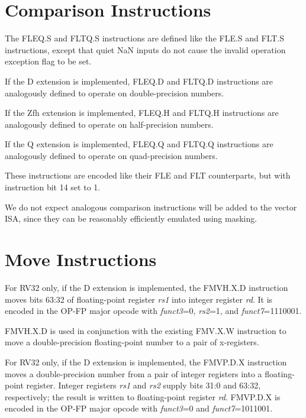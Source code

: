 \section{Comparison Instructions}

The FLEQ.S and FLTQ.S instructions are defined like the FLE.S and FLT.S
instructions, except that quiet NaN inputs do not cause the invalid
operation exception flag to be set.

If the D extension is implemented, FLEQ.D and FLTQ.D instructions are
analogously defined to operate on double-precision numbers.

If the Zfh extension is implemented, FLEQ.H and FLTQ.H instructions are
analogously defined to operate on half-precision numbers.

If the Q extension is implemented, FLEQ.Q and FLTQ.Q instructions are
analogously defined to operate on quad-precision numbers.

These instructions are encoded like their FLE and FLT counterparts, but
with instruction bit 14 set to 1.

\begin{commentary}
We do not expect analogous comparison instructions will be added to the vector
ISA, since they can be reasonably efficiently emulated using masking.
\end{commentary}


\section{Move Instructions}

For RV32 only, if the D extension is implemented,
the FMVH.X.D instruction moves bits 63:32 of floating-point register {\em rs1}
into integer register {\em rd}.
It is encoded in the OP-FP major opcode with {\em funct3}=0, {\em rs2}=1,
and {\em funct7}=1110001.

\begin{commentary}
FMVH.X.D is used in conjunction with the existing FMV.X.W instruction to move
a double-precision floating-point number to a pair of x-registers.
\end{commentary}

For RV32 only, if the D extension is implemented,
the FMVP.D.X instruction moves a double-precision number from a pair of integer
registers into a floating-point register.  Integer registers {\em rs1} and
{\em rs2} supply bits 31:0 and 63:32, respectively; the result is written to
floating-point register {\em rd}.
FMVP.D.X is encoded in the OP-FP major opcode with {\em funct3}=0
and {\em funct7}=1011001.


